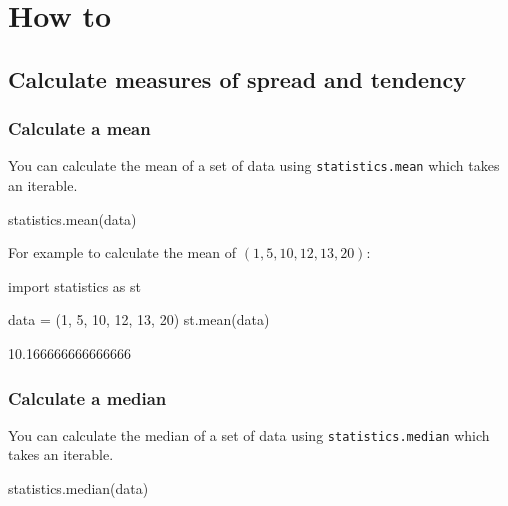 \section{How to}
\label{\detokenize{tools-for-mathematics/08-statistics/how/main:how}}\label{\detokenize{tools-for-mathematics/08-statistics/how/main::doc}}

\subsection{Calculate measures of spread and tendency}
\label{\detokenize{tools-for-mathematics/08-statistics/how/main:calculate-measures-of-spread-and-tendency}}

\subsubsection{Calculate a mean}
\label{\detokenize{tools-for-mathematics/08-statistics/how/main:calculate-a-mean}}

You can calculate the mean of a set of data using \texttt{statistics.mean} which takes an
iterable.


\begin{pyin}
statistics.mean(data)
\end{pyin}



For example to calculate the mean of \((1, 5, 10, 12, 13, 20)\):




\begin{pyin}
import statistics as st

data = (1, 5, 10, 12, 13, 20)
st.mean(data)
\end{pyin}





\begin{raw}
10.166666666666666
\end{raw}





\subsubsection{Calculate a median}
\label{\detokenize{tools-for-mathematics/08-statistics/how/main:calculate-a-median}}

You can calculate the median of a set of data using \texttt{statistics.median} which takes an
iterable.


\begin{pyin}
statistics.median(data)
\end{pyin}



